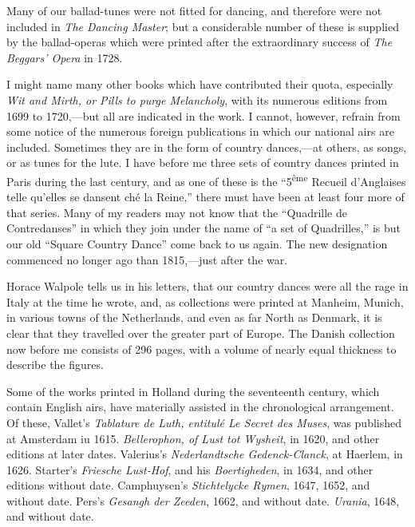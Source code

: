 
Many of our ballad-tunes were not fitted for dancing, and therefore were not 
included in \textit{The Dancing Master}; but a considerable number of these is supplied
by the ballad-operas which were printed after the extraordinary success of \textit{The
Beggars' Opera} in 1728.

I might name many other books which have contributed their quota, especially
\textit{Wit and Mirth, or Pills to purge Melancholy}, with its numerous editions from 1699
to 1720,—but all are indicated in the work. I cannot, however, refrain from
some notice of the numerous foreign publications in which our national airs are
included. Sometimes they are in the form of country dances,—at others, as
songs, or as tunes for the lute. I have before me three sets of country dances
printed in Paris during the last century, and as one of these is the “5\textsuperscript{ême} Recueil
d’Anglaises telle qu’elles se dansent ché la Reine,” there must have been at least
four more of that series. Many of my readers may not know that the “Quadrille
de Contredanses” in which they join under the name of “a set of Quadrilles,”
is but our old “Square Country Dance” come back to us again. The
new designation commenced no longer ago than 1815,—just after the war.

Horace Walpole tells us in his letters, that our country dances were all the rage
in Italy at the time he wrote, and, as collections were printed at Manheim, Munich,
in various towns of the Netherlands, and even as far North as Denmark, it is
clear that they travelled over the greater part of Europe. The Danish collection
now before me consists of 296 pages, with a volume of nearly equal thickness to
describe the figures.

Some of the works printed in Holland during the seventeenth century, which
contain English airs, have materially assisted in the chronological arrangement.
Of these, Vallet’s \textit{Tablature de Luth, entitulé Le Secret des Muses}, was published
at Amsterdam iu 1615. \textit{Bellerophon, of Lust tot Wysheit}, in 1620, and other
editions at later dates. Valerius’s \textit{Nederlandtsche Gedenck-Clanck}, at Haerlem,
in 1626. Starter’s \textit{Friesche Lust-Hof}, and his \textit{Boertigheden}, in 1634, and other
editions without date. Camphuysen’s \textit{Stichtelycke Rymen}, 1647, 1652, and
without date. Pers’s \textit{Gesangh der Zeeden}, 1662, and without date. \textit{Urania},
1648, and without date.

